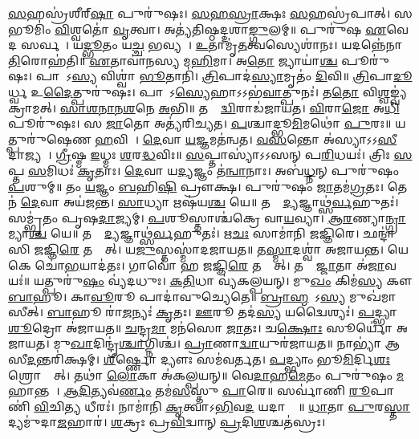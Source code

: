 

\ul{𑌸}𑌹𑌸𑍍𑌰॑𑌶𑍀𑌰𑍍‌\ul{𑌷𑌾} 𑌪𑍁𑌰𑍁॑𑌷𑌃। 
\ul{𑌸}\ul{𑌹}\ul{𑌸𑍍𑌰𑌾}𑌕𑍍𑌷𑌃 \ul{𑌸}𑌹𑌸𑍍𑌰॑𑌪𑌾𑌤𑍍। 
𑌸 𑌭𑍂𑌮𑌿𑌂॑ \ul{𑌵𑌿}𑌶𑍍𑌵𑌤𑍋॑ \ul{𑌵𑍃}𑌤𑍍𑌵𑌾। 
𑌅𑌤𑍍𑌯॑𑌤𑌿𑌷𑍍𑌠𑌦𑍍𑌦𑌶𑌾\ul{𑌙𑍍𑌗𑍁}𑌲𑌮𑍍॥ 
% 
𑌪𑍁𑌰𑍁॑𑌷 \ul{𑌏}𑌵𑍇𑌦 𑌸𑌰𑍍𑌵𑌮𑍍᳚। 
𑌯\ul{𑌦𑍍𑌭𑍂}𑌤𑌂 𑌯\ul{𑌚𑍍𑌚} 𑌭𑌵𑍍𑌯𑌮𑍍᳚। 
\ul{𑌉}𑌤𑌾𑌮𑍃॑\ul{𑌤}𑌤𑍍𑌵𑌸𑍍𑌯𑍇𑌶𑌾॑𑌨𑌃। 
𑌯𑌦𑌨𑍍𑌨𑍇॑𑌨𑌾\ul{𑌤𑌿}𑌰𑍋𑌹॑𑌤𑌿॥ 
% 
\ul{𑌏}𑌤𑌾𑌵𑌾॑𑌨𑌸𑍍𑌯 𑌮\ul{𑌹𑌿}𑌮𑌾। 
𑌅\ul{𑌤𑍋} 𑌜𑍍𑌯𑌾𑌯𑌾॑\ul{𑌶𑍍𑌚} 𑌪𑍂𑌰𑍁॑𑌷𑌃। 
𑌪𑌾𑌦𑍋᳚𑌽\ul{𑌸𑍍𑌯} 𑌵𑌿𑌶𑍍𑌵𑌾॑ \ul{𑌭𑍂}𑌤𑌾𑌨𑌿॑। 
\ul{𑌤𑍍𑌰𑌿}𑌪𑌾𑌦॑\ul{𑌸𑍍𑌯𑌾}𑌮𑍃𑌤𑌂॑ \ul{𑌦𑌿}𑌵𑌿॥ 
% 
\ul{𑌤𑍍𑌰𑌿}𑌪𑌾\ul{𑌦𑍂}𑌰𑍍𑌧𑍍𑌵 𑌉\ul{𑌦𑍈}𑌤𑍍𑌪𑍁𑌰𑍁॑𑌷𑌃। 
𑌪𑌾𑌦𑍋᳚𑌽\ul{𑌸𑍍𑌯𑍇}𑌹𑌾𑌽𑌽𑌭॑\ul{𑌵𑌾}𑌤𑍍𑌪𑍁𑌨𑌃॑। 
𑌤\ul{𑌤𑍋} 𑌵𑌿\ul{𑌶𑍍𑌵}𑌙𑍍𑌵𑍍𑌯॑𑌕𑍍𑌰𑌾𑌮𑌤𑍍। 
\ul{𑌸𑌾}\ul{𑌶}\ul{𑌨𑌾}\ul{𑌨}\ul{𑌶}𑌨𑍇 \ul{𑌅}𑌭𑌿॥ 
% 
𑌤𑌸𑍍𑌮𑌾᳚\ul{𑌦𑍍𑌵𑌿}𑌰𑌾𑌡॑𑌜𑌾𑌯𑌤। 
\ul{𑌵𑌿}𑌰𑌾\ul{𑌜𑍋} 𑌅\ul{𑌧𑌿} 𑌪𑍂𑌰𑍁॑𑌷𑌃। 
𑌸 \ul{𑌜𑌾}𑌤𑍋 𑌅𑌤𑍍𑌯॑𑌰𑌿𑌚𑍍𑌯𑌤। 
\ul{𑌪}𑌶𑍍𑌚𑌾𑌦𑍍𑌭𑍂\ul{𑌮𑌿}𑌮𑌥𑍋॑ \ul{𑌪𑍁}𑌰𑌃॥ 
% 
 𑌯𑌤𑍍𑌪𑍁𑌰𑍁॑𑌷𑍇𑌣 \ul{𑌹}𑌵𑌿𑌷𑌾᳚। 
\ul{𑌦𑍇}𑌵𑌾 \ul{𑌯}𑌜𑍍𑌞𑌮𑌤॑𑌨𑍍𑌵𑌤। 
\ul{𑌵}\ul{𑌸}𑌨𑍍𑌤𑍋 𑌅॑𑌸𑍍𑌯𑌾𑌽𑌽\ul{𑌸𑍀}𑌦𑌾𑌜𑍍𑌯𑌮𑍍᳚। 
\ul{𑌗𑍍𑌰𑍀}𑌷𑍍𑌮 \ul{𑌇}𑌧𑍍𑌮𑌃 \ul{𑌶}𑌰\ul{𑌦𑍍𑌧}𑌵𑌿𑌃॥ 
% 
 \ul{𑌸}𑌪𑍍𑌤𑌾𑌸𑍍𑌯𑌾॑𑌽𑌽𑌸𑌨𑍍  𑌪\ul{𑌰𑌿}𑌧𑌯𑌃॑। 
𑌤𑍍𑌰𑌿𑌃 \ul{𑌸}𑌪𑍍𑌤 \ul{𑌸}𑌮𑌿𑌧𑌃॑ \ul{𑌕𑍃}𑌤𑌾𑌃। 
\ul{𑌦𑍇}𑌵𑌾 𑌯\ul{𑌦𑍍𑌯}𑌜𑍍𑌞𑌂 𑌤॑\ul{𑌨𑍍𑌵𑌾}𑌨𑌾𑌃। 
𑌅𑌬॑\ul{𑌧𑍍𑌨}𑌨𑍍 𑌪𑍁𑌰𑍁॑𑌷𑌂 \ul{𑌪}𑌶𑍁𑌮𑍍॥ 
% 
 𑌤𑌂 \ul{𑌯}𑌜𑍍𑌞𑌂 \ul{𑌬}\ar 𑌹𑌿\ul{𑌷𑌿} 𑌪𑍍𑌰𑍗𑌕𑍍𑌷\sn। 
𑌪𑍁𑌰𑍁॑𑌷𑌂 \ul{𑌜𑌾}𑌤𑌮॑\ul{𑌗𑍍𑌰}𑌤𑌃। 
𑌤𑍇𑌨॑ \ul{𑌦𑍇}𑌵𑌾 𑌅𑌯॑𑌜𑌨𑍍𑌤। 
\ul{𑌸𑌾}𑌧𑍍𑌯𑌾 𑌋𑌷॑𑌯\ul{𑌶𑍍𑌚} 𑌯𑍇॥ 
% 
𑌤𑌸𑍍𑌮𑌾᳚\ul{𑌦𑍍𑌯}𑌜𑍍𑌞𑌾𑌥𑍍𑌸॑\ul{𑌰𑍍𑌵}𑌹𑍁𑌤𑌃॑। 
𑌸𑌮𑍍𑌭𑍃॑𑌤𑌂 𑌪𑍃𑌷\ul{𑌦𑌾}𑌜𑍍𑌯𑌮𑍍। 
\ul{𑌪}𑌶𑍂𑌸𑍍𑌤𑌾𑌶𑍍𑌚॑𑌕𑍍𑌰𑍇 𑌵𑌾\ul{𑌯}𑌵𑍍𑌯𑌾\sn{}। 
\ul{𑌆}\ul{𑌰}𑌣𑍍𑌯𑌾\ul{𑌨𑍍𑌗𑍍𑌰𑌾}𑌮𑍍𑌯𑌾\ul{𑌶𑍍𑌚} 𑌯𑍇॥ 
% 
 𑌤𑌸𑍍𑌮𑌾᳚\ul{𑌦𑍍𑌯}𑌜𑍍𑌞𑌾𑌥𑍍𑌸॑\ul{𑌰𑍍𑌵}𑌹𑍁𑌤𑌃॑। 
𑌋\ul{𑌚𑌃} 𑌸𑌾𑌮𑌾॑𑌨𑌿 𑌜𑌜𑍍𑌞𑌿𑌰𑍇। 
𑌛𑌨𑍍𑌦𑌾॑𑌸𑌿 𑌜𑌜𑍍𑌞𑌿\ul{𑌰𑍇} 𑌤𑌸𑍍𑌮𑌾᳚𑌤𑍍। 
𑌯\ul{𑌜𑍁}𑌸𑍍𑌤𑌸𑍍𑌮𑌾॑𑌦𑌜𑌾𑌯𑌤॥ 
% 
𑌤\ul{𑌸𑍍𑌮𑌾}𑌦𑌶𑍍𑌵𑌾॑ 𑌅𑌜𑌾𑌯𑌨𑍍𑌤। 
𑌯𑍇 𑌕𑍇 𑌚𑍋॑\ul{𑌭}𑌯𑌾𑌦॑𑌤𑌃। 
𑌗𑌾𑌵𑍋॑ 𑌹 𑌜𑌜𑍍𑌞𑌿\ul{𑌰𑍇} 𑌤𑌸𑍍𑌮𑌾᳚𑌤𑍍। 
𑌤𑌸𑍍𑌮𑌾᳚\ul{𑌜𑍍𑌜𑌾}𑌤𑌾 𑌅॑\ul{𑌜𑌾}𑌵𑌯𑌃॑॥ 
% 
𑌯𑌤𑍍𑌪𑍁𑌰𑍁॑\ul{𑌷𑌂} 𑌵𑍍𑌯॑𑌦𑌧𑍁𑌃। 
\ul{𑌕}\ul{𑌤𑌿}𑌧𑌾 𑌵𑍍𑌯॑𑌕𑌲𑍍𑌪𑌯𑌨𑍍। 
𑌮𑍁\ul{𑌖𑌂} 𑌕𑌿𑌮॑\ul{𑌸𑍍𑌯} 𑌕𑍗 \ul{𑌬𑌾}𑌹𑍂। 
𑌕𑌾\ul{𑌵𑍂}𑌰𑍂 𑌪𑌾𑌦𑌾॑𑌵𑍁𑌚𑍍𑌯𑍇𑌤𑍇॥ 
% 
\ul{𑌬𑍍𑌰𑌾}\ul{𑌹𑍍𑌮}𑌣𑍋᳚𑌽\ul{𑌸𑍍𑌯} 𑌮𑍁𑌖॑𑌮𑌾𑌸𑍀𑌤𑍍। 
\ul{𑌬𑌾}𑌹𑍂 𑌰𑌾॑\ul{𑌜}𑌨𑍍𑌯𑌃॑ \ul{𑌕𑍃}𑌤𑌃। 
\ul{𑌊}𑌰𑍂 𑌤𑌦॑\ul{𑌸𑍍𑌯} 𑌯𑌦𑍍𑌵𑍈𑌶𑍍𑌯𑌃॑। 
\ul{𑌪}𑌦𑍍𑌭𑍍𑌯𑌾 \ul{𑌶𑍂}𑌦𑍍𑌰𑍋 𑌅॑𑌜𑌾𑌯𑌤॥ 
% 
\ul{𑌚}𑌨𑍍𑌦𑍍𑌰\ul{𑌮𑌾} 𑌮𑌨॑𑌸𑍋 \ul{𑌜𑌾}𑌤𑌃। 
𑌚\ul{𑌕𑍍𑌷𑍋𑌃} 𑌸𑍂𑌰𑍍𑌯𑍋॑ 𑌅𑌜𑌾𑌯𑌤। 
𑌮𑍁\ul{𑌖𑌾}𑌦𑌿𑌨𑍍𑌦𑍍𑌰॑\ul{𑌶𑍍𑌚𑌾}𑌗𑍍𑌨𑌿𑌶𑍍𑌚॑। 
\ul{𑌪𑍍𑌰𑌾}𑌣𑌾\ul{𑌦𑍍𑌵𑌾}𑌯𑍁𑌰॑𑌜𑌾𑌯𑌤॥ 
% 
𑌨𑌾𑌭𑍍𑌯𑌾॑ 𑌆𑌸𑍀\ul{𑌦}𑌨𑍍𑌤𑌰𑌿॑𑌕𑍍𑌷𑌮𑍍। 
\ul{𑌶𑍀}𑌰𑍍𑌷𑍍𑌣𑍋 𑌦𑍍𑌯𑍗𑌃 𑌸𑌮॑𑌵𑌰𑍍𑌤𑌤। 
\ul{𑌪}𑌦𑍍𑌭𑍍𑌯𑌾𑌂 𑌭𑍂\ul{𑌮𑌿}𑌰𑍍𑌦𑌿\ul{𑌶𑌃} 𑌶𑍍𑌰𑍋𑌤𑍍𑌰𑌾᳚𑌤𑍍। 
𑌤𑌥𑌾॑ \ul{𑌲𑍋}𑌕𑌾 𑌅॑𑌕𑌲𑍍𑌪𑌯𑌨𑍍॥ 
% 
𑌵𑍇\ul{𑌦𑌾}𑌹\ul{𑌮𑍇}𑌤𑌂 𑌪𑍁𑌰𑍁॑𑌷𑌂 \ul{𑌮}𑌹𑌾𑌨𑍍𑌤𑌮𑍍᳚। 
\ul{𑌆}\ul{𑌦𑌿}𑌤𑍍𑌯𑌵॑\ul{𑌰𑍍𑌣𑌂} 𑌤𑌮॑\ul{𑌸}𑌸𑍍𑌤𑍁 \ul{𑌪𑌾}𑌰𑍇॥ 
% 
𑌸𑌰𑍍𑌵𑌾॑𑌣𑌿 \ul{𑌰𑍂}𑌪𑌾𑌣𑌿॑ \ul{𑌵𑌿}𑌚𑌿\ul{𑌤𑍍𑌯} 𑌧𑍀𑌰𑌃॑। 
𑌨𑌾𑌮𑌾॑𑌨𑌿 \ul{𑌕𑍃}𑌤𑍍𑌵𑌾𑌽\ul{𑌭𑌿}𑌵\ul{𑌦}\an{} 𑌯𑌦𑌾𑌸𑍍𑌤𑍇᳚॥ 
% 
\ul{𑌧𑌾}𑌤𑌾 \ul{𑌪𑍁}𑌰\ul{𑌸𑍍𑌤𑌾}𑌦𑍍𑌯𑌮𑍁॑𑌦𑌾\ul{𑌜}𑌹𑌾𑌰॑। 
\ul{𑌶}𑌕𑍍𑌰𑌃 𑌪𑍍𑌰\ul{𑌵𑌿}𑌦𑍍𑌵𑌾𑌨𑍍  \ul{𑌪𑍍𑌰}𑌦𑌿\ul{𑌶}𑌶𑍍𑌚𑌤॑𑌸𑍍𑌰𑌃। 

